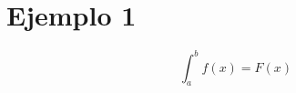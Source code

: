 \documentclass{article} %
\begin{document}


\lipsum[1-2] %


\section{Ejemplo 1}


\[\int_{a}^{b} f(x) = F(x)\]
\end{document}
